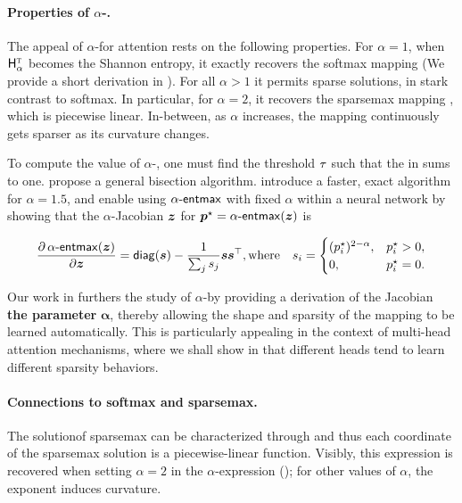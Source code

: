 \paragraph*{Properties of {\boldmath $\alpha$}-\entmaxtext.}
The appeal of $\alpha$-\entmaxtext for attention rests on the
following properties. For $\alpha=1$, \ie when $\mathsf{H}^{{\textsc{t}}}_\alpha$ becomes
the Shannon entropy, it exactly recovers the softmax mapping (We
provide a short derivation in ). For all $\alpha>1$
it permits sparse solutions, in stark contrast to softmax. In
particular, for $\alpha=2$, it recovers the sparsemax mapping
\citep{sparsemax}, which is piecewise linear. In-between, as $\alpha$
increases, the mapping continuously gets sparser as its curvature
changes.

To compute the value of $\alpha$-\entmaxtext, one must find the
threshold $\tau$ such that the \rhs in  sums
to one. \citet{blondel2019learning} propose a general bisection
algorithm. \citet{entmax} introduce a faster, exact algorithm for
$\alpha=1.5$, and enable using $\mathop{\mathsf{\alpha}\textnormal{-}\mathsf{entmax}}$ with fixed $\alpha$ within
a neural network by showing that the $\alpha$-\entmaxtext Jacobian
\wrt $\bm{z}$ for $\bm{p}^\star = \mathop{\mathsf{\alpha}\textnormal{-}\mathsf{entmax}}(\bm{z})$ is

\begin{equation}
    \begin{aligned}
        \frac{\partial \mathop{\mathsf{\alpha}\textnormal{-}\mathsf{entmax}}(\bm{z})}{\partial \bm{z}} = \operatorname*{\mathsf{diag}}(\bm{s}) - \frac{1}{\sum_j s_j} \bm{ss}^\top,
        \text{where}\quad s_i = \begin{cases}(p_i^\star)^{2-\alpha}, & p_i^\star > 0, \\
             0,                        & p_i^\star = 0. \\\end{cases}
    \end{aligned}
\end{equation}

Our work in  furthers the study of
$\alpha$-\entmaxtext by providing a derivation of the Jacobian {\bf
        \wrt the parameter} $\boldsymbol{\alpha}$, thereby allowing the shape
and sparsity of the mapping to be learned automatically. This is
particularly appealing in the context of multi-head attention
mechanisms, where we shall show in  that different
heads tend to learn different sparsity behaviors.

\paragraph*{Connections to softmax and sparsemax.}\label{sec:softmax}
The solutionof sparsemax can be characterized through 
and thus each coordinate of the sparsemax solution is a piecewise-linear function.
Visibly, this expression is recovered when setting $\alpha=2$ in the
$\alpha$-\entmaxtext expression (); for other
values of $\alpha$, the exponent induces curvature.

